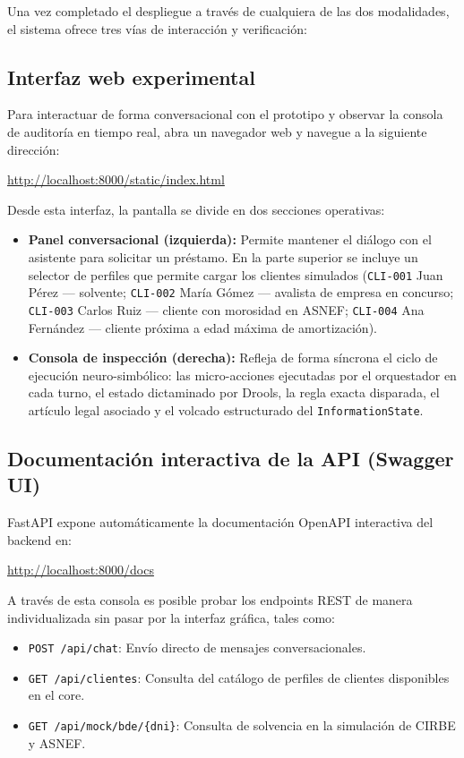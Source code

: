 Una vez completado el despliegue a través de cualquiera de las dos modalidades, el sistema ofrece tres vías de interacción y verificación:

\subsection{Interfaz web experimental}

Para interactuar de forma conversacional con el prototipo y observar la consola de auditoría en tiempo real, abra un navegador web y navegue a la siguiente dirección:

\begin{center}
\url{http://localhost:8000/static/index.html}
\end{center}

Desde esta interfaz, la pantalla se divide en dos secciones operativas:
\begin{itemize}
    \item \textbf{Panel conversacional (izquierda):} Permite mantener el diálogo con el asistente para solicitar un préstamo. En la parte superior se incluye un selector de perfiles que permite cargar los clientes simulados (\texttt{CLI-001} Juan Pérez — solvente; \texttt{CLI-002} María Gómez — avalista de empresa en concurso; \texttt{CLI-003} Carlos Ruiz — cliente con morosidad en ASNEF; \texttt{CLI-004} Ana Fernández — cliente próxima a edad máxima de amortización).
    \item \textbf{Consola de inspección (derecha):} Refleja de forma síncrona el ciclo de ejecución neuro-simbólico: las micro-acciones ejecutadas por el orquestador en cada turno, el estado dictaminado por Drools, la regla exacta disparada, el artículo legal asociado y el volcado estructurado del \texttt{InformationState}.
\end{itemize}

\subsection{Documentación interactiva de la API (Swagger UI)}

FastAPI expone automáticamente la documentación OpenAPI interactiva del backend en:

\begin{center}
\url{http://localhost:8000/docs}
\end{center}

A través de esta consola es posible probar los endpoints REST de manera individualizada sin pasar por la interfaz gráfica, tales como:
\begin{itemize}
    \item \texttt{POST /api/chat}: Envío directo de mensajes conversacionales.
    \item \texttt{GET /api/clientes}: Consulta del catálogo de perfiles de clientes disponibles en el core.
    \item \texttt{GET /api/mock/bde/\{dni\}}: Consulta de solvencia en la simulación de CIRBE y ASNEF.
\end{itemize}

